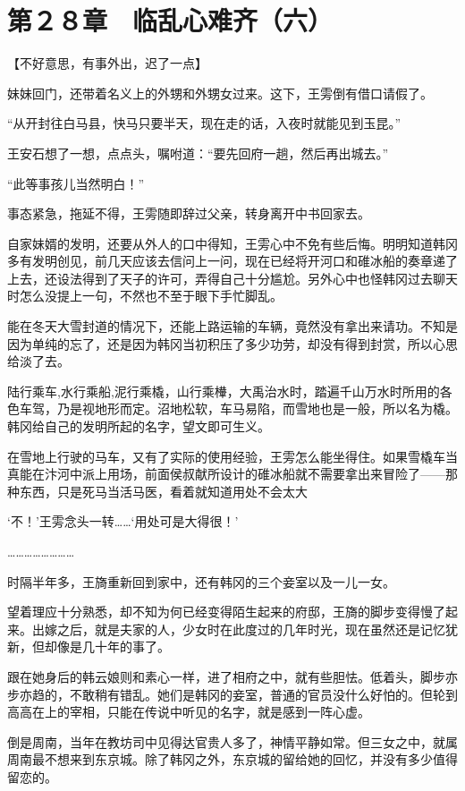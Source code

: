 \section{第２８章　临乱心难齐（六）}

【不好意思，有事外出，迟了一点】

妹妹回门，还带着名义上的外甥和外甥女过来。这下，王雱倒有借口请假了。

“从开封往白马县，快马只要半天，现在走的话，入夜时就能见到玉昆。”

王安石想了一想，点点头，嘱咐道：“要先回府一趟，然后再出城去。”

“此等事孩儿当然明白！”

事态紧急，拖延不得，王雱随即辞过父亲，转身离开中书回家去。

自家妹婿的发明，还要从外人的口中得知，王雱心中不免有些后悔。明明知道韩冈多有发明创见，前几天应该去信问上一问，现在已经将开河口和碓冰船的奏章递了上去，还设法得到了天子的许可，弄得自己十分尴尬。另外心中也怪韩冈过去聊天时怎么没提上一句，不然也不至于眼下手忙脚乱。

能在冬天大雪封道的情况下，还能上路运输的车辆，竟然没有拿出来请功。不知是因为单纯的忘了，还是因为韩冈当初积压了多少功劳，却没有得到封赏，所以心思给淡了去。

陆行乘车,水行乘船,泥行乘橇，山行乘檋，大禹治水时，踏遍千山万水时所用的各色车驾，乃是视地形而定。沼地松软，车马易陷，而雪地也是一般，所以名为橇。韩冈给自己的发明所起的名字，望文即可生义。

在雪地上行驶的马车，又有了实际的使用经验，王雱怎么能坐得住。如果雪橇车当真能在汴河中派上用场，前面侯叔献所设计的碓冰船就不需要拿出来冒险了——那种东西，只是死马当活马医，看着就知道用处不会太大

‘不！’王雱念头一转……‘用处可是大得很！’

……………………

时隔半年多，王旖重新回到家中，还有韩冈的三个妾室以及一儿一女。

望着理应十分熟悉，却不知为何已经变得陌生起来的府邸，王旖的脚步变得慢了起来。出嫁之后，就是夫家的人，少女时在此度过的几年时光，现在虽然还是记忆犹新，但却像是几十年的事了。

跟在她身后的韩云娘则和素心一样，进了相府之中，就有些胆怯。低着头，脚步亦步亦趋的，不敢稍有错乱。她们是韩冈的妾室，普通的官员没什么好怕的。但轮到高高在上的宰相，只能在传说中听见的名字，就是感到一阵心虚。

倒是周南，当年在教坊司中见得达官贵人多了，神情平静如常。但三女之中，就属周南最不想来到东京城。除了韩冈之外，东京城的留给她的回忆，并没有多少值得留恋的。

